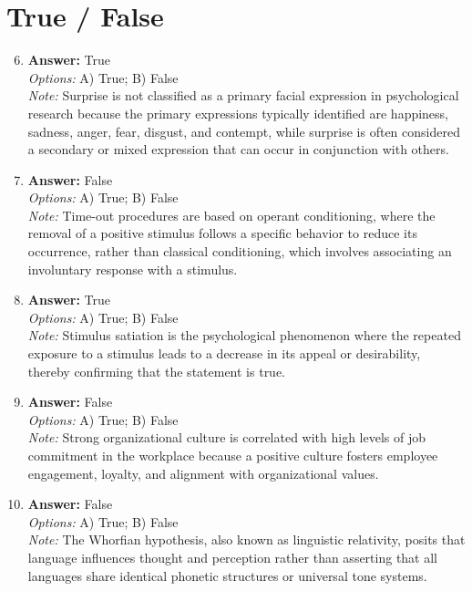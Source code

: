 \documentclass[12pt]{article}
\begin{document}
\section*{True / False}
\begin{enumerate}[label=\arabic*.]
\setcounter{enumi}{5}
\item \textbf{Answer:} True
\\ \textit{Options:} A) True; B) False
\\ \textit{Note:} Surprise is not classified as a primary facial expression in psychological research because the primary expressions typically identified are happiness, sadness, anger, fear, disgust, and contempt, while surprise is often considered a secondary or mixed expression that can occur in conjunction with others.
\item \textbf{Answer:} False
\\ \textit{Options:} A) True; B) False
\\ \textit{Note:} Time-out procedures are based on operant conditioning, where the removal of a positive stimulus follows a specific behavior to reduce its occurrence, rather than classical conditioning, which involves associating an involuntary response with a stimulus.
\item \textbf{Answer:} True
\\ \textit{Options:} A) True; B) False
\\ \textit{Note:} Stimulus satiation is the psychological phenomenon where the repeated exposure to a stimulus leads to a decrease in its appeal or desirability, thereby confirming that the statement is true.
\item \textbf{Answer:} False
\\ \textit{Options:} A) True; B) False
\\ \textit{Note:} Strong organizational culture is correlated with high levels of job commitment in the workplace because a positive culture fosters employee engagement, loyalty, and alignment with organizational values.
\item \textbf{Answer:} False
\\ \textit{Options:} A) True; B) False
\\ \textit{Note:} The Whorfian hypothesis, also known as linguistic relativity, posits that language influences thought and perception rather than asserting that all languages share identical phonetic structures or universal tone systems.
\end{enumerate}
\end{document}
